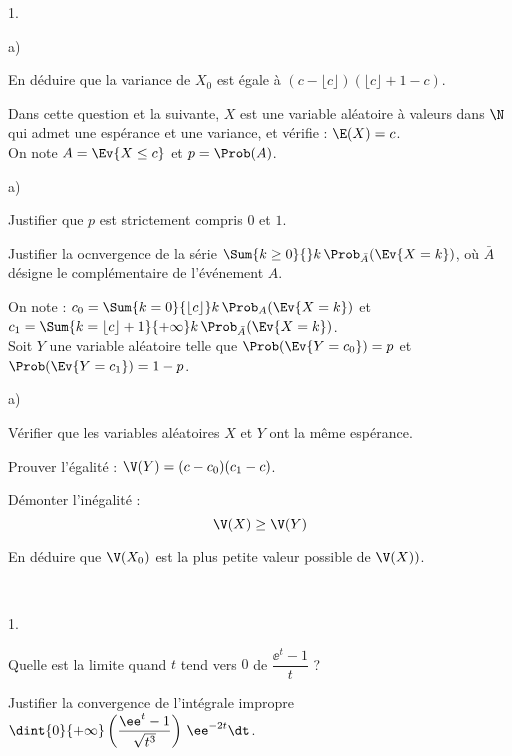 \documentclass[11pt]{article}%
\begin{document}
\begin{exerciceAP}
\begin{noliste}{1.}
\begin{noliste}{a)}
      \item En déduire que la variance de $X_0$ est égale à 
      $(c- \lfloor c \rfloor )(\lfloor c \rfloor +1-c)$.
    \end{noliste}
    
    \item Dans cette question et la suivante, $X$ est une variable 
    aléatoire à valeurs dans $\N$ qui admet une espérance et une 
    variance, et vérifie : $\E(X)=c$.\\
    On note $A= \Ev{X \leq c}$ et $p=\Prob(A)$.
    \begin{noliste}{a)}
    \setlength{\itemsep}{2mm}
      \item Justifier que $p$ est strictement compris $0$ et $1$.
      
      \item Justifier la ocnvergence de la série $\Sum{k\geq 0}{} 
      k \, \Prob_{\bar{A}}(\Ev{X=k})$, où $\bar{A}$ désigne le 
      complémentaire de l'événement $A$.
    \end{noliste}
    
    \item On note : $c_0 = \Sum{k=0}{\lfloor c \rfloor} 
    k \, \Prob_A(\Ev{X=k})$ et $c_1 = \Sum{k= \lfloor c \rfloor +1}
    {+\infty} k \, \Prob_{\bar{A}}(\Ev{X=k})$.\\[.1cm]
    Soit $Y$ une variable aléatoire telle que $\Prob(\Ev{Y=c_0})
    =p$ et $\Prob(\Ev{Y=c_1})=1-p$.
    \begin{noliste}{a)}
    \setlength{\itemsep}{2mm}
      \item Vérifier que les variables aléatoires $X$ et $Y$ ont la même
      espérance.
      
      \item Prouver l'égalité : $\V(Y) = (c-c_0)(c_1-c)$.
      
      \item Démonter l'inégalité :
      \[
        \V(X) \geq \V(Y)
      \]
      
      \item En déduire que $\V(X_0)$ est la plus petite valeur possible 
      de $\V(X))$.
    \end{noliste}
  \end{noliste}
\end{exerciceAP}


\begin{exerciceSP}~
  \begin{noliste}{1.}
    \setlength{\itemsep}{2mm}
    \item Quelle est la limite quand $t$ tend vers $0$ de 
    $\dfrac{\ee^t -1}{t}$ ?
    
    \item Justifier la convergence de l'intégrale impropre 
    $\dint{0}{+\infty} \left( \dfrac{\ee^t -1}{\sqrt{t^3}} \right)
    \, \ee^{-2t} \dt$.
  \end{noliste}
\end{exerciceSP}
\end{document}
